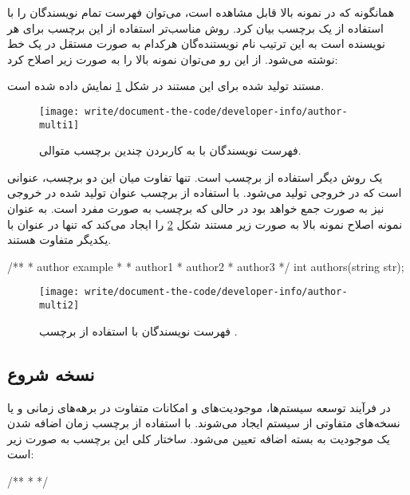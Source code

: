 همانگونه که در نمونه بالا قابل مشاهده است، می‌توان فهرست تمام نویسندگان را با
استفاده از یک برچسب بیان کرد.
روش مناسب‌تر استفاده از این برچسب برای هر نویسنده است به این ترتیب نام
نویستنده‌گان هرکدام به صورت مستقل در یک خط نوشته می‌شود.
از این رو می‌توان نمونه بالا را به صورت زیر اصلاح کرد:
مستند تولید شده برای این مستند در شکل \ref{write/document-the-code/developer-info/author-multi1}
نمایش داده شده است.
\begin{figure}
	\centering
	\texttt{[image: write/document-the-code/developer-info/author-multi1]}
	\caption[فهرست نویسندگان]{
		فهرست نویسندگان با به کاربردن چندین برچسب متوالی.
	}
	\label{write/document-the-code/developer-info/author-multi1}
\end{figure}

یک روش دیگر استفاده از برچسب  است.
تنها تفاوت میان این دو برچسب، عنوانی است که در خروجی تولید می‌شود.
با استفاده از برچسب  عنوان تولید شده در خروجی نیز به صورت جمع خواهد
بود در حالی که برچسب  به صورت مفرد است.
به عنوان نمونه اصلاح نمونه بالا به صورت زیر مستند شکل
\ref{write/document-the-code/developer-info/author-multi2} را ایجاد می‌کند که
تنها در عنوان با یکدیگر متفاوت هستند.
\begin{C++}
/**
 * \brief author example
 *
 * \authors author1
 * \authors author2
 * \authors author3
 */
int authors(string str);
\end{C++}
\begin{figure}
	\centering
	\texttt{[image: write/document-the-code/developer-info/author-multi2]}
	\caption[فهرست نویسندگان]{
		فهرست نویسندگان با استفاده از برچسب .
	}
	\label{write/document-the-code/developer-info/author-multi2}
\end{figure}


\subsection{نسخه شروع}

در فرآیند توسعه سیستم‌ها، موجودیت‌های و امکانات متفاوت در برهه‌های زمانی و یا
نسخه‌های متفاوتی از سیستم ایجاد می‌شوند.
با استفاده از برچسب  زمان اضافه شدن یک موجودیت به بسته اضافه تعیین می‌شود.
ساختار کلی این برچسب به صورت زیر است:
\begin{C++}
/**
 * 
 */
\end{C++}

